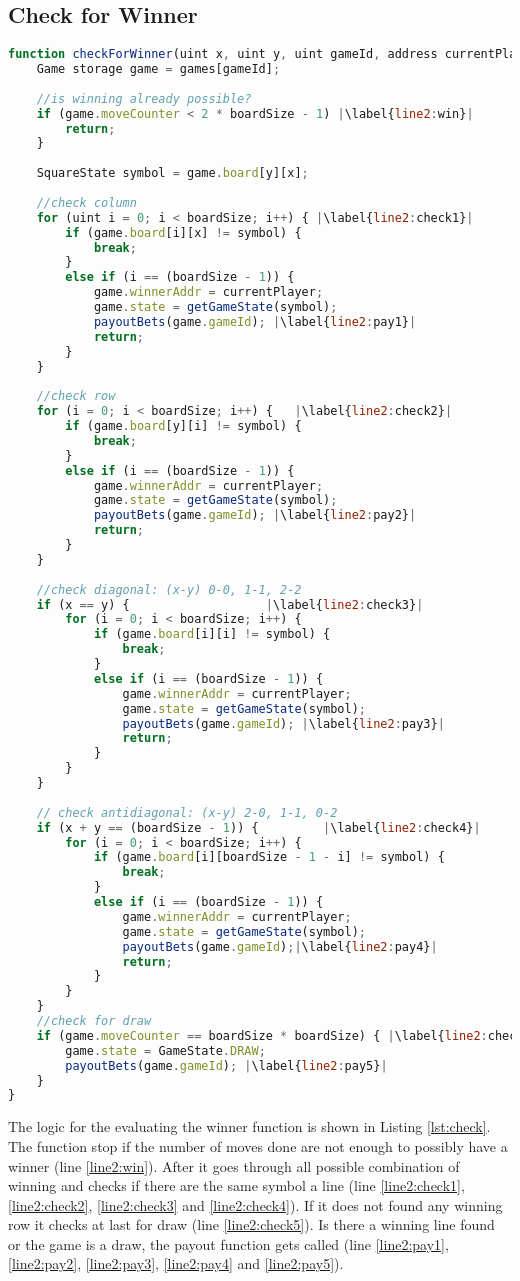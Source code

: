 \subsection{Check for Winner}\label{subsec:check}
\begin{lstlisting}[caption={Check for Winner Function on the Smart Contract}, label={lst:check},language=JavaScript,escapechar=|]
function checkForWinner(uint x, uint y, uint gameId, address currentPlayer) private {
	Game storage game = games[gameId];
	
	//is winning already possible?
	if (game.moveCounter < 2 * boardSize - 1) |\label{line2:win}|
		return;
	}
	
	SquareState symbol = game.board[y][x];
	
	//check column
	for (uint i = 0; i < boardSize; i++) { |\label{line2:check1}|
		if (game.board[i][x] != symbol) {
			break;
		}
		else if (i == (boardSize - 1)) {
			game.winnerAddr = currentPlayer;
			game.state = getGameState(symbol);
			payoutBets(game.gameId); |\label{line2:pay1}|
			return;
		}
	}
	
	//check row
	for (i = 0; i < boardSize; i++) {	|\label{line2:check2}|
		if (game.board[y][i] != symbol) {
			break;
		}
		else if (i == (boardSize - 1)) {
			game.winnerAddr = currentPlayer;
			game.state = getGameState(symbol);
			payoutBets(game.gameId); |\label{line2:pay2}|
			return;
		}
	}
	
	//check diagonal: (x-y) 0-0, 1-1, 2-2 
	if (x == y) {					|\label{line2:check3}|
		for (i = 0; i < boardSize; i++) {
			if (game.board[i][i] != symbol) {
				break;
			}
			else if (i == (boardSize - 1)) {
				game.winnerAddr = currentPlayer;
				game.state = getGameState(symbol);
				payoutBets(game.gameId); |\label{line2:pay3}|
				return;
			}
		}
	}
	
	// check antidiagonal: (x-y) 2-0, 1-1, 0-2
	if (x + y == (boardSize - 1)) {			|\label{line2:check4}|
		for (i = 0; i < boardSize; i++) {
			if (game.board[i][boardSize - 1 - i] != symbol) {
				break;
			}
			else if (i == (boardSize - 1)) {
				game.winnerAddr = currentPlayer;
				game.state = getGameState(symbol);
				payoutBets(game.gameId);|\label{line2:pay4}|
				return;
			}
		}
	}
	//check for draw
	if (game.moveCounter == boardSize * boardSize) { |\label{line2:check5}|
		game.state = GameState.DRAW;
		payoutBets(game.gameId); |\label{line2:pay5}|
	}
}
\end{lstlisting}

The logic for the evaluating the winner function is shown in Listing \ref{lst:check}. The function stop if the number of moves done are not enough to possibly have a winner (line \ref{line2:win}). After it goes through all possible combination of winning and checks if there are the same symbol a line (line \ref{line2:check1}, \ref{line2:check2}, \ref{line2:check3} and \ref{line2:check4}). If it does not found any winning row it checks at last for draw (line \ref{line2:check5}). Is there a winning line found or the game is a draw, the payout function gets called (line \ref{line2:pay1}, \ref{line2:pay2}, \ref{line2:pay3}, \ref{line2:pay4} and \ref{line2:pay5}).